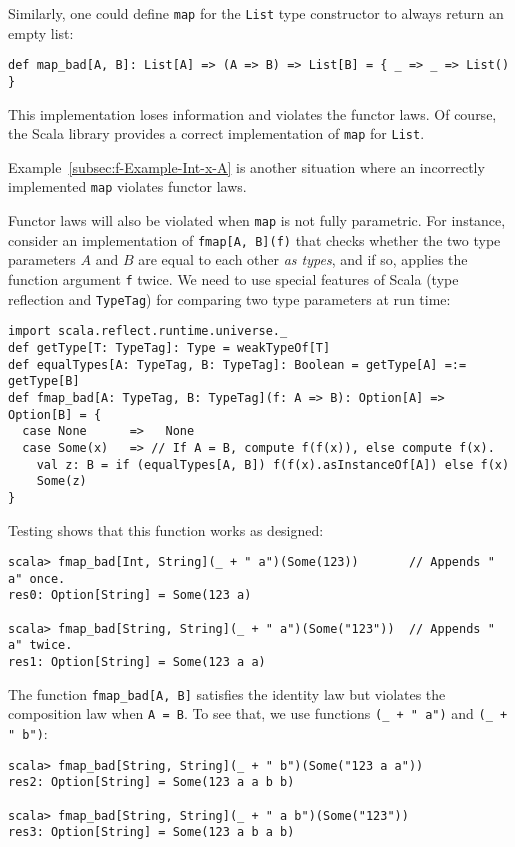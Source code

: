 Similarly, one could define \lstinline!map! for the \lstinline!List!
type constructor to always return an empty list:
\begin{lstlisting}
def map_bad[A, B]: List[A] => (A => B) => List[B] = { _ => _ => List() }
\end{lstlisting}
This implementation loses information and violates the functor laws.
Of course, the Scala library provides a correct implementation of
\lstinline!map! for \lstinline!List!.

Example~\ref{subsec:f-Example-Int-x-A} is another situation where
an incorrectly implemented \lstinline!map! violates functor laws.

Functor laws will also be violated when \lstinline!map! is not fully
parametric. For instance, consider an implementation of \lstinline!fmap[A, B](f)!
that checks whether the two type parameters $A$ and $B$ are equal
to each other \emph{as types}, and if so, applies the function argument
\lstinline!f! twice. We need to use special features of Scala (type
reflection and \lstinline!TypeTag!) for comparing two type parameters
at run time:
\begin{lstlisting}
import scala.reflect.runtime.universe._
def getType[T: TypeTag]: Type = weakTypeOf[T]
def equalTypes[A: TypeTag, B: TypeTag]: Boolean = getType[A] =:= getType[B]
def fmap_bad[A: TypeTag, B: TypeTag](f: A => B): Option[A] => Option[B] = {
  case None      =>   None
  case Some(x)   => // If A = B, compute f(f(x)), else compute f(x).
    val z: B = if (equalTypes[A, B]) f(f(x).asInstanceOf[A]) else f(x)
    Some(z)
}
\end{lstlisting}
Testing shows that this function works as designed:
\begin{lstlisting}
scala> fmap_bad[Int, String](_ + " a")(Some(123))       // Appends " a" once.
res0: Option[String] = Some(123 a)

scala> fmap_bad[String, String](_ + " a")(Some("123"))  // Appends " a" twice.
res1: Option[String] = Some(123 a a)
\end{lstlisting}
The function \lstinline!fmap_bad[A, B]! satisfies the identity law
but violates the composition law when \lstinline!A = B!. To see that,
we use functions \lstinline!(_ + " a")! and \lstinline!(_ + " b")!:
\begin{lstlisting}
scala> fmap_bad[String, String](_ + " b")(Some("123 a a"))
res2: Option[String] = Some(123 a a b b)

scala> fmap_bad[String, String](_ + " a b")(Some("123"))
res3: Option[String] = Some(123 a b a b)
\end{lstlisting}

